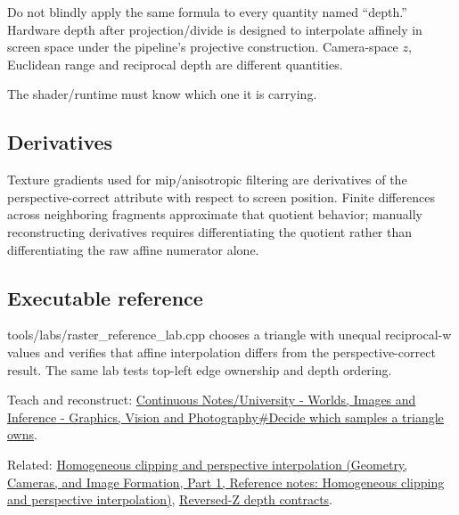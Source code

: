 \hypertarget{appendix-1ed5f96c73ea-depth-is-a-separate-contract}{}

Do not blindly apply the same formula to every quantity named ``depth.'' Hardware depth after projection/divide is designed to interpolate affinely in screen space under the pipeline's projective construction. Camera-space \(z\), Euclidean range and reciprocal depth are different quantities.

The shader/runtime must know which one it is carrying.

\subsection{Derivatives}\label{appendix-1ed5f96c73ea-derivatives}

\hypertarget{appendix-1ed5f96c73ea-derivatives}{}

Texture gradients used for mip/anisotropic filtering are derivatives of the perspective-correct attribute with respect to screen position. Finite differences across neighboring fragments approximate that quotient behavior; manually reconstructing derivatives requires differentiating the quotient rather than differentiating the raw affine numerator alone.

\subsection{Executable reference}\label{appendix-1ed5f96c73ea-executable-reference}

\hypertarget{appendix-1ed5f96c73ea-executable-reference}{}

tools/labs/raster\_reference\_lab.cpp chooses a triangle with unequal reciprocal-w values and verifies that affine interpolation differs from the perspective-correct result. The same lab tests top-left edge ownership and depth ordering.

Teach and reconstruct: \hyperref[03-visual-computing-i-ch012-decide-which-samples-a-triangle-owns]{Continuous Notes/University - Worlds, Images and Inference - Graphics, Vision and Photography\#Decide which samples a triangle owns}.

Related: \href{../03-Geometry-Cameras-and-Image-Formation-P01/main.pdf\#appendix-40426e4b2103}{Homogeneous clipping and perspective interpolation (Geometry, Cameras, and Image Formation, Part 1, Reference notes: Homogeneous clipping and perspective interpolation)}, \hyperref[appendix-275ec8847057]{Reversed-Z depth contracts}.
